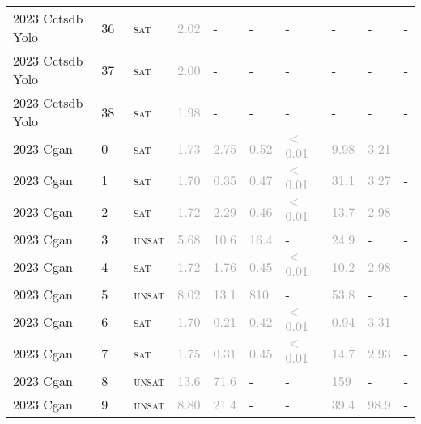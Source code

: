 \begin{center}
{\begin{longtable}{@{}llllllllll@{}}
2023 Cctsdb Yolo & 36 & ~\textsc{sat} & \textcolor{darkgray}{2.02} & - & - & - & - & - & - \\
2023 Cctsdb Yolo & 37 & ~\textsc{sat} & \textcolor{darkgray}{2.00} & - & - & - & - & - & - \\
2023 Cctsdb Yolo & 38 & ~\textsc{sat} & \textcolor{darkgray}{1.98} & - & - & - & - & - & - \\
\midrule
2023 Cgan & 0 & ~\textsc{sat} & \textcolor{darkgray}{1.73} & \textcolor{darkgray}{2.75} & \textcolor{darkgray}{0.52} & \textcolor{darkgray}{$<$0.01} & \textcolor{darkgray}{9.98} & \textcolor{darkgray}{3.21} & - \\
2023 Cgan & 1 & ~\textsc{sat} & \textcolor{darkgray}{1.70} & \textcolor{darkgray}{0.35} & \textcolor{darkgray}{0.47} & \textcolor{darkgray}{$<$0.01} & \textcolor{darkgray}{31.1} & \textcolor{darkgray}{3.27} & - \\
2023 Cgan & 2 & ~\textsc{sat} & \textcolor{darkgray}{1.72} & \textcolor{darkgray}{2.29} & \textcolor{darkgray}{0.46} & \textcolor{darkgray}{$<$0.01} & \textcolor{darkgray}{13.7} & \textcolor{darkgray}{2.98} & - \\
2023 Cgan & 3 & ~\textsc{unsat} & \textcolor{darkgray}{5.68} & \textcolor{darkgray}{10.6} & \textcolor{darkgray}{16.4} & - & \textcolor{darkgray}{24.9} & - & - \\
2023 Cgan & 4 & ~\textsc{sat} & \textcolor{darkgray}{1.72} & \textcolor{darkgray}{1.76} & \textcolor{darkgray}{0.45} & \textcolor{darkgray}{$<$0.01} & \textcolor{darkgray}{10.2} & \textcolor{darkgray}{2.98} & - \\
2023 Cgan & 5 & ~\textsc{unsat} & \textcolor{darkgray}{8.02} & \textcolor{darkgray}{13.1} & \textcolor{darkgray}{810} & - & \textcolor{darkgray}{53.8} & - & - \\
2023 Cgan & 6 & ~\textsc{sat} & \textcolor{darkgray}{1.70} & \textcolor{darkgray}{0.21} & \textcolor{darkgray}{0.42} & \textcolor{darkgray}{$<$0.01} & \textcolor{darkgray}{0.94} & \textcolor{darkgray}{3.31} & - \\
2023 Cgan & 7 & ~\textsc{sat} & \textcolor{darkgray}{1.75} & \textcolor{darkgray}{0.31} & \textcolor{darkgray}{0.45} & \textcolor{darkgray}{$<$0.01} & \textcolor{darkgray}{14.7} & \textcolor{darkgray}{2.93} & - \\
2023 Cgan & 8 & ~\textsc{unsat} & \textcolor{darkgray}{13.6} & \textcolor{darkgray}{71.6} & - & - & \textcolor{darkgray}{159} & - & - \\
2023 Cgan & 9 & ~\textsc{unsat} & \textcolor{darkgray}{8.80} & \textcolor{darkgray}{21.4} & - & - & \textcolor{darkgray}{39.4} & \textcolor{darkgray}{98.9} & - \\

\end{longtable}}
\end{center}
